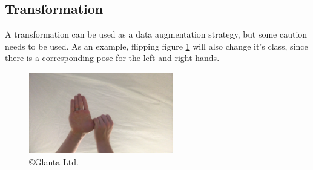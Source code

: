             \subsection{Transformation}
            A transformation can be used as a data augmentation strategy, but some caution needs to be used. As an example, flipping figure \ref{fig:flipped_example} will also change it's class, since there is a corresponding pose for the left and right hands. 

            \begin{figure}[h]
                \centering
                \includegraphics[height=100pt]{../img/flipped_example.png}
                \caption{\copyright \space Glanta Ltd.}
                \label{fig:flipped_example}
            \end{figure}

            
